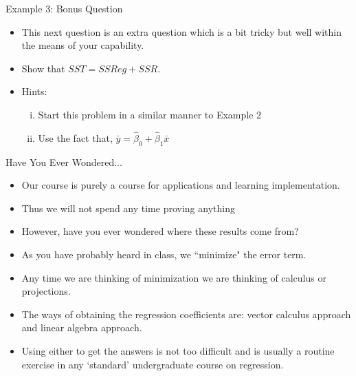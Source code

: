 \documentclass{beamer}
\begin{document}
	\begin{frame}{Example  3: Bonus Question}
		\begin{itemize}
			\item This next question is an extra question which is a bit tricky but well within the means of your capability.
			\item Show that $SST = SSReg+SSR$.
			\item Hints: \begin{enumerate}[i)]
				\item Start this problem in a similar manner to Example 2
				\item Use the fact that, $\bar{y} = \hat{\beta}_0+\hat{\beta}_1\bar{x}$
			\end{enumerate}
			
		\end{itemize}
	\end{frame}
	
	\begin{frame}{Have You Ever Wondered...}
		\begin{itemize}
			\item Our course is purely a course for applications and learning implementation.
			\item Thus we will not spend any time proving anything
			\item However, have you ever wondered where these results come from?
			\item As you have probably heard in class, we ``minimize" the error term.
			\item Any time we are thinking of minimization we are thinking of calculus or projections.
			\item The ways of obtaining the regression coefficients are: vector calculus approach and linear algebra approach. 
			\item Using either to get the answers is not too difficult and is usually a routine exercise in any `standard' undergraduate course on regression.
		\end{itemize}
	\end{frame}
	
	
	
\end{document}
